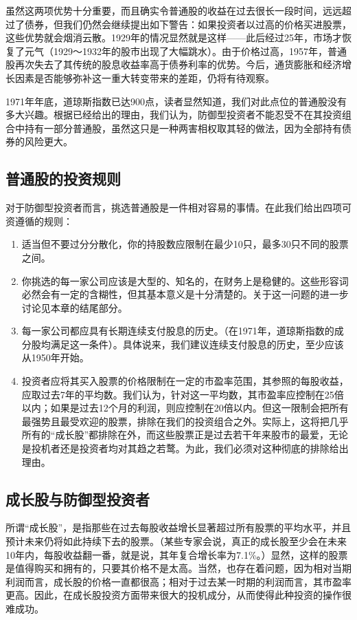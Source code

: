 \documentclass[12pt,oneside]{book}
\begin{document}
虽然这两项优势十分重要，而且确实令普通股的收益在过去很长一段时间，远远超过了债券，但我们仍然会继续提出如下警告：如果投资者以过高的价格买进股票，这些优势就会烟消云散。1929年的情况显然就是这样——此后经过25年，市场才恢复了元气（1929～1932年的股市出现了大幅跳水）。由于价格过高，1957年，普通股再次失去了其传统的股息收益率高于债券利率的优势。今后，通货膨胀和经济增长因素是否能够弥补这一重大转变带来的差距，仍将有待观察。

1971年年底，道琼斯指数已达900点，读者显然知道，我们对此点位的普通股没有多大兴趣。根据已经给出的理由，我们认为，防御型投资者不能忍受不在其投资组合中持有一部分普通股，虽然这只是一种两害相权取其轻的做法，因为全部持有债券的风险更大。

\subsection{普通股的投资规则}
对于防御型投资者而言，挑选普通股是一件相对容易的事情。在此我们给出四项可资遵循的规则：

\begin{enumerate}
\item 适当但不要过分分散化，你的持股数应限制在最少10只，最多30只不同的股票之间。
\item 你挑选的每一家公司应该是大型的、知名的，在财务上是稳健的。这些形容词必然会有一定的含糊性，但其基本意义是十分清楚的。关于这一问题的进一步讨论见本章的结尾部分。
\item 每一家公司都应具有长期连续支付股息的历史。（在1971年，道琼斯指数的成分股均满足这一条件）。具体说来，我们建议连续支付股息的历史，至少应该从1950年开始。
\item 投资者应将其买入股票的价格限制在一定的市盈率范围，其参照的每股收益，应取过去7年的平均数。我们认为，针对这一平均数，其市盈率应控制在25倍以内；如果是过去12个月的利润，则应控制在20倍以内。但这一限制会把所有最强势且最受欢迎的股票，排除在我们的投资组合之外。实际上，这将把几乎所有的“成长股”都排除在外，而这些股票正是过去若干年来股市的最爱，无论是投机者还是投资者均对其趋之若鹜。为此，我们必须对这种彻底的排除给出理由。
\end{enumerate}



\subsection{成长股与防御型投资者}
所谓“成长股”，是指那些在过去每股收益增长显著超过所有股票的平均水平，并且预计未来仍将如此持续下去的股票。（某些专家会说，真正的成长股至少会在未来10年内，每股收益翻一番，就是说，其年复合增长率为7.1\%。）显然，这样的股票是值得购买和拥有的，只要其价格不是太高。当然，也存在着问题，因为相对当期利润而言，成长股的价格一直都很高；相对于过去某一时期的利润而言，其市盈率更高。因此，在成长股投资方面带来很大的投机成分，从而使得此种投资的操作很难成功。
\end{document}
